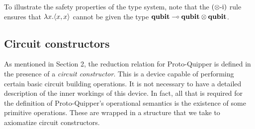 \documentclass[twoside]{article}
\begin{document}
To illustrate the safety properties of the type system, 
note that the $(\otimes\mbox{-i})$ rule ensures that 
$\lambda x. \langle x,x\rangle$ cannot be given the type 
$\textrm{\bf qubit}\multimap \textrm{\bf qubit} \otimes \textrm{\bf qubit}$.


\subsection{Circuit constructors}\label{ssec-circuit-cons}

As mentioned in Section 2, the reduction relation for 
Proto-Quipper is defined in the presence of a \emph{circuit
constructor}. This is a device capable of 
performing certain basic circuit building operations. It is 
not necessary to have a detailed description of the inner 
workings of this device. In fact, all that is required for 
the definition of Proto-Quipper's operational semantics is 
the existence of some primitive operations. These are wrapped 
in a structure that we take to axiomatize circuit constructors. 
\end{document}
